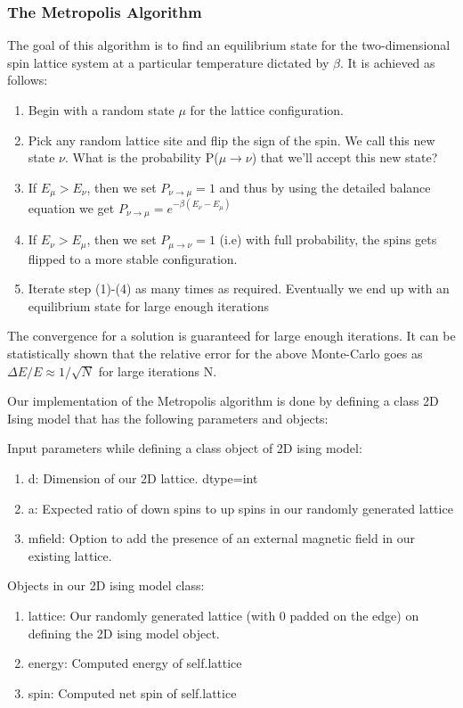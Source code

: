 \subsubsection{The Metropolis Algorithm}
The goal of this algorithm is to find an equilibrium state for the two-dimensional spin lattice system at a particular temperature dictated by \(\beta\). It is achieved as follows:
\begin{enumerate}
    \item Begin with a random state \(\mu\) for the lattice configuration.
    \item Pick any random lattice site and flip the sign of the spin. We call this new state \(\nu\). What is the probability P($\mu \rightarrow \nu$) that we'll accept this new state?
    \item If \(E_{\mu}>E_{\nu}\), then we set $P_{\nu \rightarrow \mu} = 1$ and thus by using the detailed balance equation we get $P_{\nu \rightarrow \mu} =e^{-\beta(E_{\nu}-E_{\mu})}$
    \item If $E_{\nu}>E_{\mu}$, then we set $P_{\mu \rightarrow \nu} = 1$ (i.e) with full probability, the spins gets flipped to a more stable configuration.
    \item Iterate step (1)-(4) as many times as required. Eventually we end up with an equilibrium state for large enough iterations
\end{enumerate}

The convergence for a solution is guaranteed for large enough iterations. It can be statistically shown that the relative error for the above Monte-Carlo goes as $\Delta E/E \approx 1/\sqrt{N}$ for large iterations N.

Our implementation of the Metropolis algorithm is done by defining a class 2D Ising model that has the following parameters and objects:

Input parameters while defining a class object of 2D ising model:
\begin{enumerate}

    \item d: Dimension of our 2D lattice. dtype=int
    \item a: Expected ratio of down spins to up spins in our randomly generated lattice
    \item mfield: Option to add the presence of an external magnetic field in our existing lattice.

\end{enumerate}

Objects in our 2D ising model class:
\begin{enumerate}

    \item lattice: Our randomly generated lattice (with 0 padded on the edge) on defining the 2D ising model object.
    \item energy: Computed energy of self.lattice
    \item spin: Computed net spin of self.lattice

\end{enumerate}

